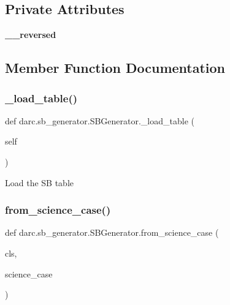 \subsection*{Private Attributes}
\begin{DoxyCompactItemize}
\item 
\mbox{\label{classdarc_1_1sb__generator_1_1_s_b_generator_aab5eab57ce9bb7fe85a87cdb9a7cef8d}} 
{\bfseries \+\_\+\+\_\+reversed}
\end{DoxyCompactItemize}


\subsection{Member Function Documentation}
\mbox{\label{classdarc_1_1sb__generator_1_1_s_b_generator_ad9de3e5ab9bb3603a54a58b2c0f670bb}} 
\subsubsection{\texorpdfstring{\_load\_table()}{\_load\_table()}}
{\footnotesize\ttfamily def darc.\+sb\+\_\+generator.\+S\+B\+Generator.\+\_\+load\+\_\+table (\begin{DoxyParamCaption}\item[{}]{self }\end{DoxyParamCaption})\hspace{0.3cm}{\ttfamily [private]}}

\begin{DoxyVerb}Load the SB table
\end{DoxyVerb}
 \mbox{\label{classdarc_1_1sb__generator_1_1_s_b_generator_ada1aac570d341d6859eee1ccb0f6d105}} 
\subsubsection{\texorpdfstring{from\_science\_case()}{from\_science\_case()}}
{\footnotesize\ttfamily def darc.\+sb\+\_\+generator.\+S\+B\+Generator.\+from\+\_\+science\+\_\+case (\begin{DoxyParamCaption}\item[{}]{cls,  }\item[{}]{science\+\_\+case }\end{DoxyParamCaption})}

